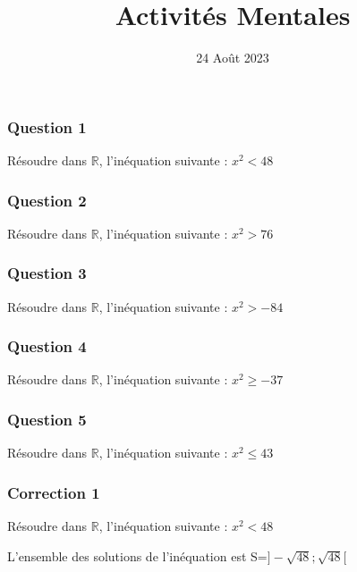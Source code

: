 \documentclass[15pt, mathserif]{beamer}
\title{Activités Mentales}
\date{24 Août 2023}
\newcommand{\R}{\mathbb{R}}			%
\begin{document}
\begin{frame}
    \titlepage
\end{frame}

\begin{frame} 
	\frametitle{Question 1}
Résoudre dans $\R$, l'inéquation suivante : $x^2<48$\end{frame}


\begin{frame} 
	\frametitle{Question 2}
 Résoudre dans $\R$, l'inéquation suivante : $x^2>76$\end{frame}


\begin{frame} 
	\frametitle{Question 3}
 Résoudre dans $\R$, l'inéquation suivante : $x^2>-84$\end{frame}


\begin{frame} 
	\frametitle{Question 4}
 Résoudre dans $\R$, l'inéquation suivante : $x^2\geqslant-37$\end{frame}


\begin{frame} 
	\frametitle{Question 5}
Résoudre dans $\R$, l'inéquation suivante : $x^2\leqslant43$\end{frame}


\begin{frame}
\vspace{-10mm}
	\frametitle{Correction 1}
\begin{multicols}{2} 
 \bigskip 
 Résoudre dans $\R$, l'inéquation suivante : $x^2<48$ 
 
 \bigskip 
 
 L'ensemble des solutions de l'inéquation est S=$]-\sqrt{48};\sqrt{48}[$
 
 \end{multicols}\end{frame}
\end{document}
